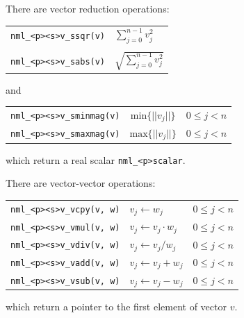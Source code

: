 \documentclass[twoside,12pt]{article}
\begin{document}
There are vector reduction operations:
\begin{center}
\begin{tabular}{l|l}
{\tt nml\_<p><s>v\_ssqr(v)}	&$\sum_{j\!=\!0}^{n\!-\!1} v_{j}^{2}$	\\
									\\
{\tt nml\_<p><s>v\_sabs(v)}	&$\sqrt{\sum_{j\!=\!0}^{n\!-\!1} v_{j}^{2}}$
\end{tabular}
\end{center}
and
\begin{center}
\begin{tabular}{l|c|l}
{\tt nml\_<p><s>v\_sminmag(v)}&$\mbox{min}\{||v_{j}||\}$&$0 \leq j < n$	\\
{\tt nml\_<p><s>v\_smaxmag(v)}&$\mbox{max}\{||v_{j}||\}$&$0 \leq j < n$	\\
\end{tabular}
\end{center}
which return a real scalar {\tt nml\_<p>scalar}.

There are vector-vector operations:
\begin{center}
\begin{tabular}{c|l|l}
{\tt nml\_<p><s>v\_vcpy(v, w)}&$v_{j} \leftarrow w_{j}$&$0 \leq j < n$	      \\
{\tt nml\_<p><s>v\_vmul(v, w)}&$v_{j} \leftarrow v_{j}\cdot w_{j}$&$0 \leq j < n$\\
{\tt nml\_<p><s>v\_vdiv(v, w)}&$v_{j} \leftarrow v_{j}/w_{j}$&$0 \leq j < n$  \\
{\tt nml\_<p><s>v\_vadd(v, w)}&$v_{j} \leftarrow v_{j} + w_{j}$&$0 \leq j < n$\\
{\tt nml\_<p><s>v\_vsub(v, w)}&$v_{j} \leftarrow v_{j} - w_{j}$&$0 \leq j < n$
\end{tabular}
\end{center}
which return a pointer to the first element of vector $v$.



\end{document}
